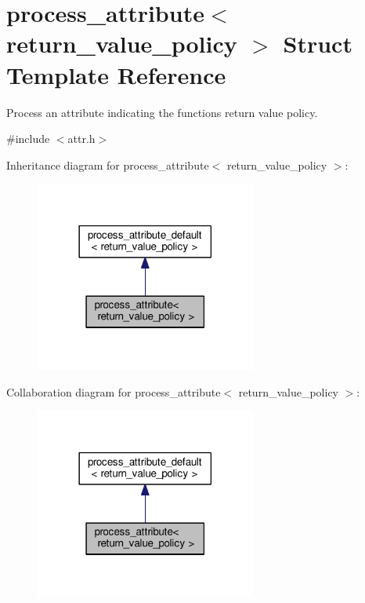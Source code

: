 \hypertarget{structprocess__attribute_3_01return__value__policy_01_4}{}\section{process\+\_\+attribute$<$ return\+\_\+value\+\_\+policy $>$ Struct Template Reference}
\label{structprocess__attribute_3_01return__value__policy_01_4}


Process an attribute indicating the function\textquotesingle{}s return value policy.  




{\ttfamily \#include $<$attr.\+h$>$}



Inheritance diagram for process\+\_\+attribute$<$ return\+\_\+value\+\_\+policy $>$\+:
\nopagebreak
\begin{figure}[H]
\begin{center}
\leavevmode
\includegraphics[width=206pt]{structprocess__attribute_3_01return__value__policy_01_4__inherit__graph}
\end{center}
\end{figure}


Collaboration diagram for process\+\_\+attribute$<$ return\+\_\+value\+\_\+policy $>$\+:
\nopagebreak
\begin{figure}[H]
\begin{center}
\leavevmode
\includegraphics[width=206pt]{structprocess__attribute_3_01return__value__policy_01_4__coll__graph}
\end{center}
\end{figure}
